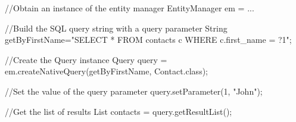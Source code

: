 

//Obtain an instance of the entity manager
EntityManager em = ...

//Build the SQL query string with a query parameter
String getByFirstName="SELECT * FROM contacts c WHERE c.first_name = ?1";

//Create the Query instance
Query query = em.createNativeQuery(getByFirstName, Contact.class);

//Set the value of the query parameter
query.setParameter(1, "John");

//Get the list of results
List contacts = query.getResultList();
